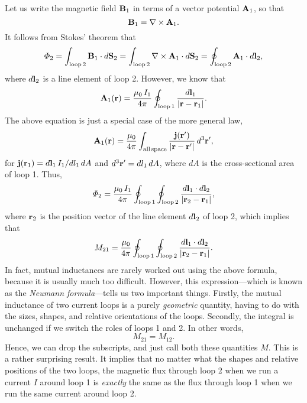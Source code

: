 Let us write the magnetic field ${\bf B}_1$ in terms of a vector potential ${\bf A}_1$, so that
\begin{equation}
{\bf B}_1 = \nabla\times {\bf A}_1.
\end{equation}
It follows from Stokes' theorem that
\begin{equation}\label{e7.5}
{\mit\Phi}_2 = \int_{\rm loop \,2} {\bf B}_1\cdot d{\bf S}_2 = \int_{\rm loop \,2}
\nabla\times {\bf A}_1 \cdot d{\bf S}_2 = \oint_{\rm loop\, 2} {\bf A}_1 \cdot
d{\bf l}_2,
\end{equation}
where $d{\bf l}_2 $ is a line element of loop 2. 
However, we know that
\begin{equation}
{\bf A}_1 ({\bf r}) = \frac{\mu_0 \,I_1}{4\pi}
\oint_{\rm loop \,1} \frac{d {\bf l}_1}{|{\bf r} - {\bf r}_1|}.
\end{equation}
 The above equation is just a special case of the more general law,
\begin{equation}
{\bf A}_1({\bf r}) = \frac{\mu_0}{4\pi} \int_{\rm all \,space} 
\frac{{\bf j}({\bf r}')}
{|{\bf r} - {\bf r}'|} \,d^3{\bf r}',
\end{equation}
for ${\bf j}({\bf r}_1) = d{\bf l}_1 \,I_1/ dl_1\, dA$ and $d^3{\bf r}' = dl_1 \,dA$, where
$dA$ is the cross-sectional area of loop 1. Thus,
\begin{equation}
{\mit\Phi}_2 = \frac{\mu_0 \,I_1}{4\pi} 
\oint_{\rm loop \,1}\oint_{\rm loop \,2} \frac{d{\bf l}_1\cdot d{\bf l}_2}{|{\bf r}_2-
{\bf r}_1|},
\end{equation}
where ${\bf r}_2$ is the position vector of the line element $d{\bf l}_2$
of loop 2, which implies that
\begin{equation}
M_{21}   = \frac{\mu_0}{4\pi} 
\oint_{\rm loop\, 1}\oint_{\rm loop \,2} \frac{d{\bf l}_1\cdot d{\bf l}_2}{|{\bf r}_2-
{\bf r}_1|}.
\end{equation}
In fact, mutual
inductances are rarely worked out using the above formula, because it is usually
much too difficult. However, this expression---which is known as the {\em Neumann formula}---tells us two important things. 
Firstly, the mutual inductance of two current loops is a purely {\em geometric}\/ quantity,
having to do with the sizes, shapes, and relative orientations of the loops.
Secondly, the integral is unchanged if we switch the roles of loops 1 and 2.
In other words, 
\begin{equation}
M_{21} = M_{12}.
\end{equation}
Hence, we can drop the subscripts, and just call both  these quantities $M$.
This is a rather surprising result. It implies that no matter what the shapes and
relative positions of the two loops, the magnetic flux through loop 2 when we run a
current $I$ around loop 1 is {\em exactly} the same as the flux through loop 1
when we run the same current around loop 2.
 
